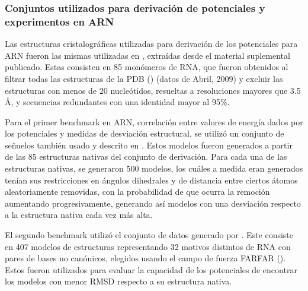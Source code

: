 \subsubsection{Conjuntos utilizados para derivación de potenciales y experimentos en ARN}
\par
Las estructuras cristalográficas utilizadas para derivación de los potenciales para ARN fueron las mismas utilizadas en \cite{Capriotti2011}, extraídas desde el material suplemental publicado.
Estas consisten en 85 monómeros de RNA, que fueron obtenidos al filtrar todas las estructuras de la PDB (\cite{Berman2000}) (datos de Abril, 2009) y excluir las estructuras con menos de 20 nucleótidos, resueltas a resoluciones mayores que 3.5 \si{\angstrom}, y secuencias redundantes con una identidad mayor al 95\%.
\par
Para el primer benchmark en ARN, correlación entre valores de energía dados por los potenciales y medidas de desviación estructural, se utilizó un conjunto de señuelos también usado y descrito en \cite{Capriotti2011}.
Estos modelos fueron generados a partir de las 85 estructuras nativas del conjunto de derivación. 
Para cada una de las estructuras nativas, se generaron 500 modelos, los cuáles a medida eran generados tenían sus restricciones en ángulos dihedrales y de distancia entre ciertos átomos aleatoriamente removidas, con la probabilidad de que ocurra la remoción aumentando progresivamente, generando así modelos con una desviación respecto a la estructura nativa cada vez más alta.
\par
El segundo benchmark utilizó el conjunto de datos generado por \cite{Das2010}. 
Este consiste en 407 modelos de estructuras representando 32 motivos distintos de RNA con pares de bases no canónicos, elegidos usando el campo de fuerza FARFAR (\cite{Das2010}). 
Estos fueron utilizados para evaluar la capacidad de los potenciales de encontrar los modelos con menor RMSD respecto a su estructura nativa.
